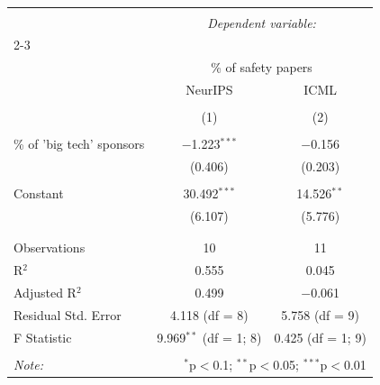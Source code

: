 
\begin{table}[!htbp] \centering 
  \caption{} 
  \label{} 
\begin{tabular}{@{\extracolsep{5pt}}lcc} 
\\[-1.8ex]\hline 
\hline \\[-1.8ex] 
 & \multicolumn{2}{c}{\textit{Dependent variable:}} \\ 
\cline{2-3} 
\\[-1.8ex] & \multicolumn{2}{c}{\% of safety papers} \\ 
 & NeurIPS & ICML \\ 
\\[-1.8ex] & (1) & (2)\\ 
\hline \\[-1.8ex] 
 \% of 'big tech' sponsors & $-$1.223$^{***}$ & $-$0.156 \\ 
  & (0.406) & (0.203) \\ 
  & & \\ 
 Constant & 30.492$^{***}$ & 14.526$^{**}$ \\ 
  & (6.107) & (5.776) \\ 
  & & \\ 
\hline \\[-1.8ex] 
Observations & 10 & 11 \\ 
R$^{2}$ & 0.555 & 0.045 \\ 
Adjusted R$^{2}$ & 0.499 & $-$0.061 \\ 
Residual Std. Error & 4.118 (df = 8) & 5.758 (df = 9) \\ 
F Statistic & 9.969$^{**}$ (df = 1; 8) & 0.425 (df = 1; 9) \\ 
\hline 
\hline \\[-1.8ex] 
\textit{Note:}  & \multicolumn{2}{r}{$^{*}$p$<$0.1; $^{**}$p$<$0.05; $^{***}$p$<$0.01} \\ 
\end{tabular} 
\end{table} 


